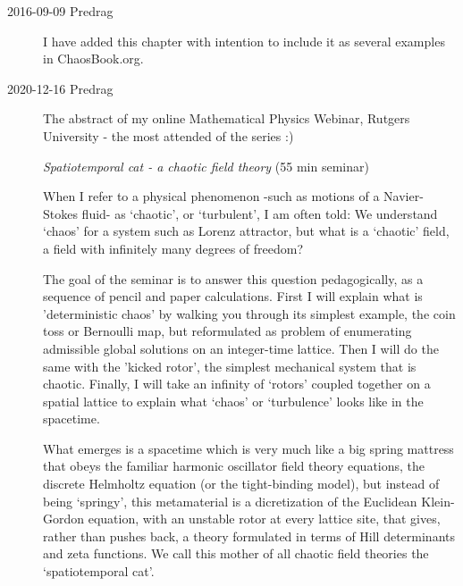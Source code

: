 

\renewcommand{\ssp}{x}

\begin{description}
\item[2016-09-09 Predrag]
I have added this chapter with intention to include it as several examples
in ChaosBook.org.

\item[2020-12-16 Predrag] The abstract of my online
Mathematical Physics Webinar,
Rutgers University - the most attended of the series :)

        \item[]  {\em %
Spatiotemporal cat - a chaotic field theory
         }
(55 min seminar)

     When I refer to a physical phenomenon -such as motions of a Navier-Stokes fluid- as `chaotic', or `turbulent', I am often told: We understand `chaos' for a system such as Lorenz attractor, but what is a `chaotic' field, a field with infinitely many degrees of freedom?

     The goal of the seminar is to answer this question pedagogically, as a sequence of pencil and paper calculations. First I will explain what is 'deterministic chaos' by walking you through its simplest example, the coin toss or Bernoulli map, but reformulated as problem of enumerating admissible global solutions on an integer-time lattice. Then I will do the same with the 'kicked rotor', the simplest mechanical system that is chaotic. Finally, I will take an infinity of `rotors' coupled together on a spatial lattice to explain what `chaos' or `turbulence' looks like in the spacetime.

      What emerges is a spacetime which is very much like a big spring mattress that obeys the familiar harmonic oscillator field theory equations, the discrete Helmholtz equation (or the tight-binding model), but instead of being `springy', this metamaterial is a dicretization of the Euclidean Klein-Gordon equation, with an unstable rotor at every lattice site, that gives, rather than pushes back, a theory formulated in terms of Hill determinants and zeta functions. We call this mother of all chaotic field theories the `spatiotemporal cat'.


\end{description}
